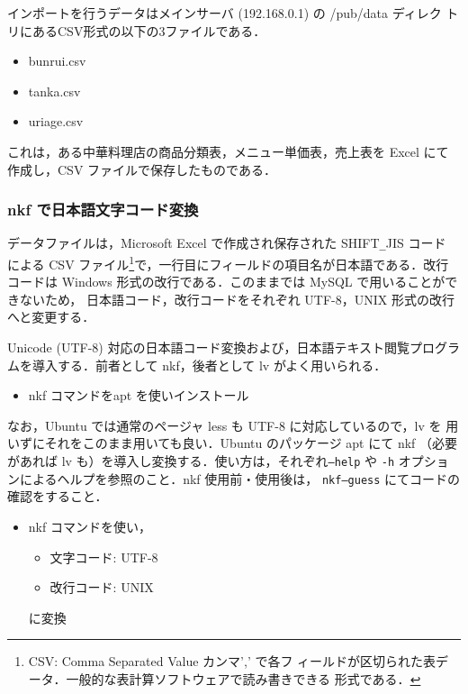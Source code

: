 インポートを行うデータはメインサーバ (192.168.0.1) の /pub/data ディレク
トリにあるCSV形式の以下の3ファイルである．
\begin{itemize}
 \item bunrui.csv
 \item tanka.csv
 \item uriage.csv
\end{itemize}

これは，ある中華料理店の商品分類表，メニュー単価表，売上表を Excel にて
作成し，CSV ファイルで保存したものである．


\subsubsection{nkf で日本語文字コード変換}

データファイルは，Microsoft Excel で作成され保存された SHIFT\verb+_+JIS コード
による CSV ファイル\footnote{CSV: Comma Separated Value カンマ',' で各フ
ィールドが区切られた表データ．一般的な表計算ソフトウェアで読み書きできる
形式である．}で，一行目にフィールドの項目名が日本語である．改行コードは 
Windows 形式の改行である．このままでは MySQL で用いることができないため，
日本語コード，改行コードをそれぞれ UTF-8，UNIX 形式の改行へと変更する．

Unicode (UTF-8) 対応の日本語コード変換および，日本語テキスト閲覧プログラ
ムを導入する．前者として nkf，後者として lv がよく用いられる．

\begin{itemize}
    \item nkf コマンドをapt を使いインストール
\end{itemize}

なお，Ubuntu では通常のページャ less も UTF-8 に対応しているので，lv を
用いずにそれをこのまま用いても良い．Ubuntu のパッケージ apt にて nkf 
（必要があれば lv も）を導入し変換する．使い方は，それぞれ\texttt{--help} 
や \texttt{-h} オプションによるヘルプを参照のこと．nkf 使用前・使用後は，
\texttt{nkf--guess} にてコードの確認をすること．

\begin{itemize}
    \item nkf コマンドを使い，
    \begin{itemize}
        \item 文字コード: UTF-8
        \item 改行コード: UNIX
    \end{itemize}
    に変換
\end{itemize}

